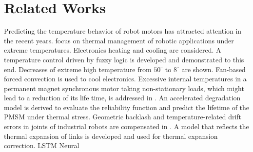 \documentclass{ifacconf}
\begin{document}
\section{Related Works}
\label{chap:relatedworks}
Predicting the temperature behavior of robot motors has attracted attention in the recent years. %
\cite{afaq2023intelligent} focus on thermal management of robotic applications under extreme temperatures. Electronics heating and cooling are considered. A temperature control driven by fuzzy logic is developed and demonstrated to this end. Decreases of extreme high temperature from $50^{\circ}$ to $8^{\circ}$ are shown. Fan-based forced convection is used to cool electronics. Excessive internal temperatures in a permanent magnet synchronous motor  taking non-stationary loads, which might lead to a reduction of its life time, is addressed in \cite{chen2024lifetime}. An accelerated degradation model is derived to evaluate the reliability function and predict the lifetime of the PMSM under thermal stress.  Geometric backlash and temperature-related drift errors in joints of industrial robots are compensated in \cite{sigron2023compensation}. A model that reflects the thermal expansion of links is developed and used for thermal expansion correction.  LSTM Neural
\end{document}
